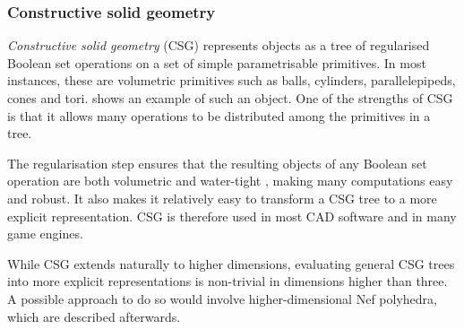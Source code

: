 \subsubsection{Constructive solid geometry}

\emph{Constructive solid geometry} (CSG) \citep[\S{}12.3]{Requicha77} represents objects as a tree of regularised Boolean set operations on a set of simple parametrisable primitives.
In most instances, these are volumetric primitives such as balls, cylinders, parallelepipeds, cones and tori.
 shows an example of such an object.
One of the strengths of CSG is that it allows many operations to be distributed among the primitives in a tree.

The regularisation step ensures that the resulting objects of any Boolean set operation are both volumetric and water-tight \citep{Requicha78}, making many computations easy and robust.
It also makes it relatively easy to transform a CSG tree to a more explicit representation.
CSG is therefore used in most CAD software and in many game engines.

While CSG extends naturally to higher dimensions, evaluating general CSG trees into more explicit representations is non-trivial in dimensions higher than three.
A possible approach to do so would involve higher-dimensional Nef polyhedra, which are described afterwards.

